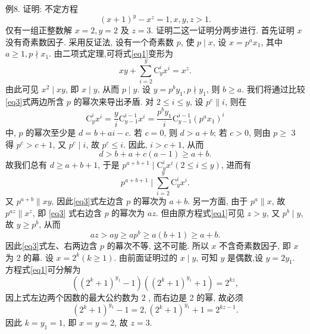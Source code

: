 例8. 证明: 不定方程
$$
(x+1)^y-x^z=1, x, y, z>1 . \label{eq1}
$$
仅有一组正整数解 $x=2, y=2$ 及 $z=3$.
证明二这一证明分两步进行.
首先证明 $x$ 没有奇素数因子.
采用反证法, 设有一个奇素数 $p$, 使 $p \mid x$, 设 $x=p^a x_1$, 其中 $a \geqslant 1, p \nmid x_1$. 由二项式定理,可将式\ref{eq1}变形为
$$
x y+\sum_{i=2}^y \mathrm{C}_y^i x^i=x^z . \label{eq3}
$$
由此可见 $x^2 \mid x y$, 即 $x \mid y$, 从而 $p \mid y$. 设 $y=p^b y_1, p \nmid y_1$, 则 $b \geqslant a$. 我们将通过比较\ref{eq3}式两边所含 $p$ 的幂次来导出矛盾.
对 $2 \leqslant i \leqslant y$, 设 $p^c \| i$, 则在
$$
\mathrm{C}_y^i x^i=\frac{y}{i} \mathrm{C}_{y-1}^{i-1} x^i=\frac{p^b y_1}{i} \mathrm{C}_{y-1}^{i-1}\left(p^a x_1\right)^i
$$
中, $p$ 的幂次至少是 $d=b+a i-c$. 若 $c=0$, 则 $d>a+b$; 若 $c>0$, 则由 $p \geqslant$ 3 得 $p^c>c+1$, 又 $p^c \mid i$, 故 $p^c \leqslant i$. 因此, $i>c+1$, 从而
$$
d>b+a+c(a-1) \geqslant a+b .
$$
故我们总有 $d \geqslant a+b+1$, 于是 $p^{a+b+1} \mid \mathrm{C}_y^i x^i(2 \leqslant i \leqslant y)$, 进而有
$$
p^{a+b+1} \mid \sum_{i=2}^y \mathrm{C}_y^i x^i .
$$
又 $p^{a+b} \| x y$, 因此\ref{eq3}式左边含 $p$ 的幂次为 $a+b$.
另一方面, 由于 $p^a \| x$, 故 $p^{a z} \| x^z$, 即 \ref{eq3} 式右边含 $p$ 的幂次为 $a z$. 但由原方程式\ref{eq1}可见 $z>y$, 又 $p^b \mid y$, 故 $y \geqslant p^b$, 从而
$$
a z>a y \geqslant a p^b \geqslant a(b+1) \geqslant a+b .
$$
因此\ref{eq3}式左、右两边含 $p$ 的幕次不等, 这不可能.
所以 $x$ 不含奇素数因子, 即 $x$ 为 2 的幕.
设 $x=2^k(k \geqslant 1)$. 由前面证明过的 $x \mid y$, 可知 $y$ 是偶数,设 $y=2 y_1$. 方程式\ref{eq1}可分解为
$$
\left(\left(2^k+1\right)^{y_1}-1\right)\left(\left(2^k+1\right)^{y_1}+1\right)=2^{k z},
$$
因上式左边两个因数的最大公约数为 2 , 而右边是 2 的幂, 故必须
$$
\left(2^k+1\right)^{y_1}-1=2,\left(2^k+1\right)^{y_1}+1=2^{k z-1} .
$$
因此 $k=y_1=1$, 即 $x=y=2$, 故 $z=3$.


